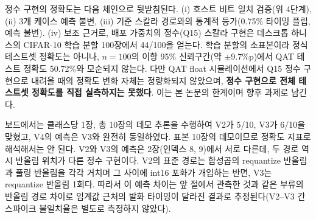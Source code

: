 정수 구현의 정확도는 다음 체인으로 뒷받침된다. (i) 호스트 비트 일치
검증(위 4단계), (ii) 3개 케이스 예측 불변, (iii) 기준 스칼라 경로와의
통계적 등가(0.75\% 타이밍 플립, 예측 불변). (iv) 보조 근거로, 배포
가중치의 정수(Q15) 스칼라 구현은 데스크톱 하니스의 CIFAR-10 학습
분할 100장에서 44/100을 얻는다. 학습 분할의 소표본이라 정식 테스트셋
정확도는 아니나, $n{=}100$의 이항 95\% 신뢰구간(약 $\pm$9.7\%p)에서
QAT 테스트 정확도 50.72\%와 모순되지 않는다. 다만 QAT float
시뮬레이션에서 Q15 정수 구현으로 내려올 때의 정확도 변화 자체는
정량화되지 않았으며, \textbf{정수 구현으로 전체 테스트셋 정확도를
직접 실측하지는 못했다}. 이는 본 논문의 한계이며 향후 과제로 남긴다.

보드에서는 클래스당 1장, 총 10장의 데모 추론을 수행하여 V2가 5/10,
V3가 6/10을 맞혔고, V4의 예측은 V3와 완전히 동일하였다. 표본 10장의
데모이므로 정확도 지표로 해석해서는 안 된다. V2와 V3의 예측은
2장(인덱스 8, 9)에서 서로 다른데, 두 경로 역시 반올림 위치가 다른 정수
구현이다. V2의 표준 경로는 합성곱의 requantize 반올림과 풀링 반올림을
각각 거치며 그 사이에 int16 포화가 개입하는 반면, V3는 requantize
반올림 1회다. 따라서 이 예측 차이는 앞 절에서 관측한 것과 같은 부류의
반올림 경로 차이로 임계값 근처의 발화 타이밍이 달라진 결과로
추정된다(V2--V3 간 스파이크 불일치율은 별도로 측정하지 않았다).
